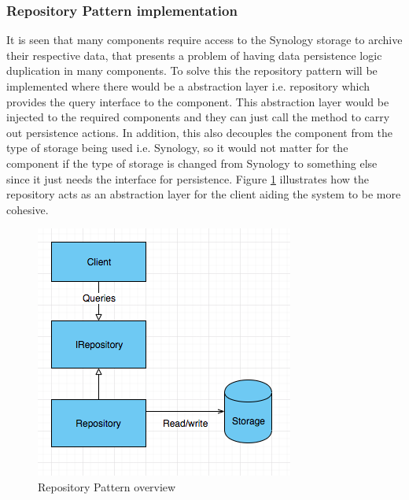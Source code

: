 \subsubsection{Repository Pattern implementation}
It is seen that many components require access to the Synology storage to archive their respective data, that presents a problem of having data
persistence logic duplication in many components. To solve this the repository pattern will be implemented where there would be a abstraction layer i.e. repository which
provides the query interface to the component. This abstraction layer would be injected to the required components and they can just call the 
method to carry out persistence actions. In addition, this also decouples the component from the type of storage being used i.e. Synology, so it would not
matter for the component if the type of storage is changed from Synology to something else since it just needs the interface for persistence. Figure 
\ref{fig:repositoryPattern} illustrates how the repository acts as an abstraction layer for the client aiding the system to be more cohesive.
 
\begin{figure}[H]
    \centering \includegraphics[scale=0.7]{grafiken/repositoryPattern.png}
    \caption{Repository Pattern overview}
    \label{fig:repositoryPattern}
\end{figure}


